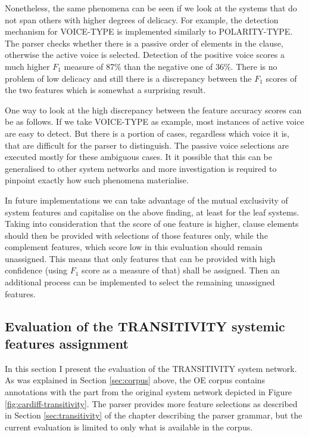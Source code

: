     Nonetheless, the same phenomena can be seen if we look at the systems that do not span others with higher degrees of delicacy. For example, the detection mechanism for VOICE-TYPE is implemented similarly to POLARITY-TYPE. The parser checks whether there is a passive order of elements in the clause, otherwise the active voice is selected.  Detection of the positive voice scores a much higher $F_1$ measure of 87\% than the negative one of 36\%. There is no problem of low delicacy and still there is a discrepancy between the $F_1$ scores of the two features which is somewhat a surprising result. 

    One way to look at the high discrepancy between the feature accuracy scores can be as follows. 
    If we take VOICE-TYPE as example, most instances of active voice are easy to detect. But there is a portion of cases, regardless which voice it is, that are difficult for the parser to distinguish. The passive voice selections are executed mostly for these ambiguous cases. It it possible that this can be generalised to other system networks and more investigation is required to pinpoint exactly how such phenomena materialise.

    In future implementations we can take advantage of the mutual exclusivity of system features and capitalise on the above finding, at least for the leaf systems. Taking into consideration that the score of one feature is higher, clause elements should then be provided with selections of those features only, while the complement features, which score low in this evaluation should remain unassigned. This means that only features that can be provided with high confidence (using $F_1$ score as a measure of that) shall be assigned. Then an additional process can be implemented to select the remaining unassigned features. 
    

\subsection{Evaluation of the TRANSITIVITY systemic features assignment}
\label{sec:systemic-evaluation-TRANSITIVITY}
    
    In this section I present the evaluation of the TRANSITIVITY system network. As was explained in Section \ref{sec:corpus} above, the OE corpus contains annotations with the part from the original system network depicted in Figure \ref{fig:cardiff-transitivity}. The parser provides more feature selections as described in Section \ref{sec:transitivity} of the chapter describing the parser grammar, but the current evaluation is limited to only what is available in the corpus. 
    
